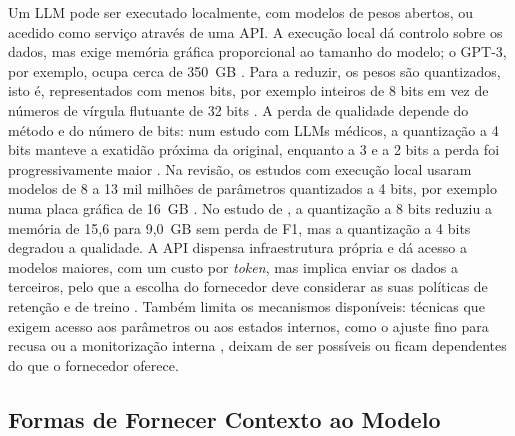 Um \gls{LLM} pode ser executado localmente, com modelos de pesos abertos, ou acedido como serviço através de uma \gls{API}. A execução local dá controlo sobre os dados, mas exige memória gráfica proporcional ao tamanho do modelo; o GPT-3, por exemplo, ocupa cerca de 350~GB \parencite{lang2024comprehensive}. Para a reduzir, os pesos são quantizados, isto é, representados com menos bits, por exemplo inteiros de 8 bits em vez de números de vírgula flutuante de 32 bits \parencite{lang2024comprehensive}. A perda de qualidade depende do método e do número de bits: num estudo com \glspl{LLM} médicos, a quantização a 4 bits manteve a exatidão próxima da original, enquanto a 3 e a 2 bits a perda foi progressivamente maior \parencite{tasfia2026how}. Na revisão, os estudos com execução local usaram modelos de 8 a 13 mil milhões de parâmetros quantizados a 4 bits, por exemplo numa placa gráfica de 16~GB \parencite{sayeed2026tutor,azam2024cancerbot}. No estudo de \textcite{walczak2026comparative}, a quantização a 8 bits reduziu a memória de 15,6 para 9,0~GB sem perda de F1, mas a quantização a 4 bits degradou a qualidade. A \gls{API} dispensa infraestrutura própria e dá acesso a modelos maiores, com um custo por \emph{token}, mas implica enviar os dados a terceiros, pelo que a escolha do fornecedor deve considerar as suas políticas de retenção e de treino \parencite{barzanji2026buddy}. Também limita os mecanismos disponíveis: técnicas que exigem acesso aos parâmetros ou aos estados internos, como o ajuste fino para recusa ou a monitorização interna \parencite{abrar2025domain,li2026responsible}, deixam de ser possíveis ou ficam dependentes do que o fornecedor oferece.

\subsection{Formas de Fornecer Contexto ao Modelo}
\label{sec:chap2_context}

